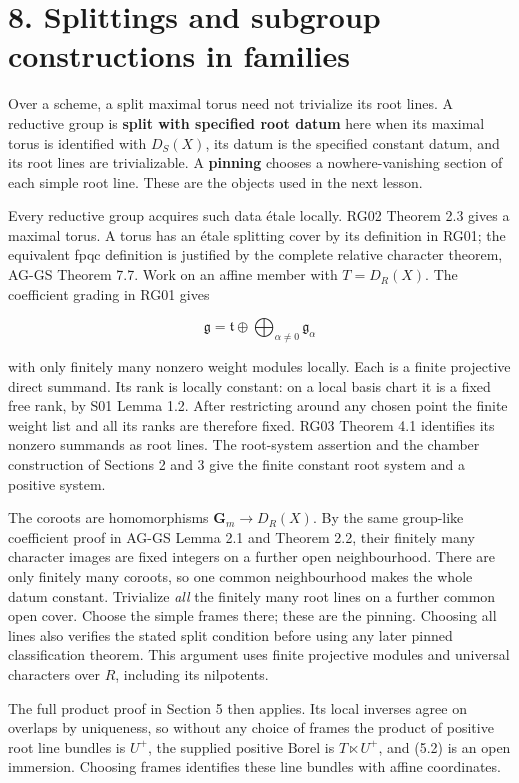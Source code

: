\documentclass[11pt,a4paper,openany]{report}
\begin{document}
\section{8. Splittings and subgroup constructions in families}\label{AG-RG-04-splittings-and-subgroup-constructions-in-families}

Over a scheme, a split maximal torus need not trivialize its root lines. A reductive group is \textbf{split with specified root datum} here when its maximal torus is identified with \(D_S(X)\), its datum is the specified constant datum, and its root lines are trivializable. A \textbf{pinning} chooses a nowhere-vanishing section of each simple root line. These are the objects used in the next lesson.

Every reductive group acquires such data étale locally. RG02 Theorem 2.3 gives a maximal torus. A torus has an étale splitting cover by its definition in RG01; the equivalent fpqc definition is justified by the complete relative character theorem, AG-GS Theorem 7.7. Work on an affine member with \(T=D_R(X)\). The coefficient grading in RG01 gives

\[
\mathfrak g=\mathfrak t\oplus\bigoplus_{\alpha\ne0}\mathfrak g_\alpha
\]

with only finitely many nonzero weight modules locally. Each is a finite projective direct summand. Its rank is locally constant: on a local basis chart it is a fixed free rank, by S01 Lemma 1.2. After restricting around any chosen point the finite weight list and all its ranks are therefore fixed. RG03 Theorem 4.1 identifies its nonzero summands as root lines. The root-system assertion and the chamber construction of Sections 2 and 3 give the finite constant root system and a positive system.

The coroots are homomorphisms \(\mathbf G_m\to D_R(X)\). By the same group-like coefficient proof in AG-GS Lemma 2.1 and Theorem 2.2, their finitely many character images are fixed integers on a further open neighbourhood. There are only finitely many coroots, so one common neighbourhood makes the whole datum constant. Trivialize \emph{all} the finitely many root lines on a further common open cover. Choose the simple frames there; these are the pinning. Choosing all lines also verifies the stated split condition before using any later pinned classification theorem. This argument uses finite projective modules and universal characters over \(R\), including its nilpotents.

The full product proof in Section 5 then applies. Its local inverses agree on overlaps by uniqueness, so without any choice of frames the product of positive root line bundles is \(U^+\), the supplied positive Borel is \(T\ltimes U^+\), and (5.2) is an open immersion. Choosing frames identifies these line bundles with affine coordinates.
\end{document}

